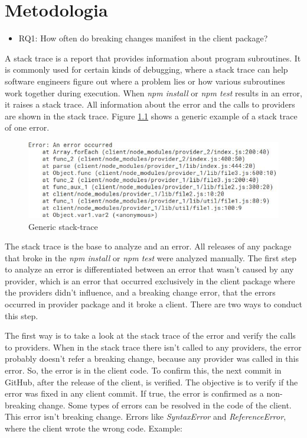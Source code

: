 \chapter{Metodologia}
\label{cap:metodologia}

\begin{itemize}
    \item RQ1: How often do breaking changes manifest in the client package?
\end{itemize}

A stack trace is a report that provides information about program subroutines. It is commonly used for certain kinds of debugging, where a stack trace can help software engineers figure out where a problem lies or how various subroutines work together during execution. When \textit{npm install} or \textit{npm test} results in an error, it raises a stack trace. All information about the error and the calls to providers are shown in the stack trace. Figure \ref{fig:trace} shows a generic example of a stack trace of one error.

\begin{figure}
    \centering
    \includegraphics[scale=0.7]{figuras/stack_trace.jpeg}
    \caption{Generic stack-trace}
    \label{fig:trace}
\end{figure}{}

The stack trace is the base to analyze and an error.
All releases of any package that broke in the \textit{npm install} or \textit{npm test} were analyzed manually. The first step to analyze an error is differentiated between an error that wasn't caused by any provider, which is an error that occurred exclusively in the client package where the providers didn’t influence, and a breaking change error, that the errors occurred in provider package and it broke a client. There are two ways to conduct this step.

The first way is to take a look at the stack trace of the error and verify the calls to providers. When in the stack trace there isn't called to any providers, the error probably doesn’t refer a breaking change, because any provider was called in this error. So, the error is in the client code. To confirm this, the next commit in GitHub, after the release of the client, is verified. The objective is to verify if the error was fixed in any client commit. If true, the error is confirmed as a non-breaking change.
Some types of errors can be resolved in the code of the client. This error isn’t breaking change. Errors like \textit{SyntaxError} and \textit{ReferenceError}, where the client wrote the wrong code. Example:

